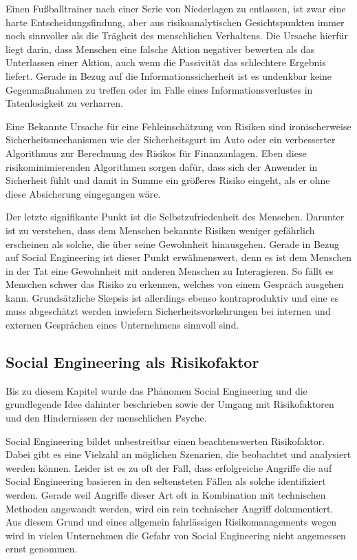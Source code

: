 Einen Fußballtrainer nach einer Serie von Niederlagen zu entlassen, ist zwar eine harte
Entscheidungsfindung, aber aus risikoanalytischen Gesichtspunkten immer noch sinnvoller als die
Trägheit des menschlichen Verhaltens.
Die Ursache hierfür liegt darin, dass Menschen eine falsche Aktion negativer bewerten als das
Unterlassen einer Aktion, auch wenn die Passivität das schlechtere Ergebnis liefert.
Gerade in Bezug auf die Informationssicherheit ist es undenkbar keine Gegenmaßnahmen zu treffen oder
im Falle eines Informationsverlustes in Tatenlosigkeit zu verharren.

Eine Bekannte Ursache für eine Fehleinschätzung von Risiken sind ironischerweise
Sicherheitsmechanismen wie der Sicherheitsgurt im Auto oder ein verbesserter Algorithmus zur
Berechnung des Risikos für Finanzanlagen.
Eben diese risikominimierenden Algorithmen sorgen dafür, dass sich der Anwender in Sicherheit fühlt
und damit in Summe ein größeres Risiko eingeht, als er ohne diese Absicherung eingegangen wäre.

Der letzte signifikante Punkt ist die Selbstzufriedenheit des Menschen. Darunter ist zu verstehen,
dass dem Menschen bekannte Risiken weniger gefährlich erscheinen als solche, die über seine Gewohnheit
hinausgehen.
Gerade in Bezug auf Social Engineering ist dieser Punkt erwähnenswert, denn es ist dem Menschen in der
Tat eine Gewohnheit mit anderen Menschen zu Interagieren.
So fällt es Menschen schwer das Risiko zu erkennen, welches von einem Gespräch ausgehen kann.
Grundsätzliche Skepsis ist allerdings ebenso kontraproduktiv und eine es muss abgeschätzt werden
inwiefern Sicherheitsvorkehrungen bei internen und externen Gesprächen eines Unternehmens sinnvoll
sind.
\cite{risikomanagement}

\subsection{Social Engineering als Risikofaktor}\label{sec:social_engineering_als_risikofaktor}
Bis zu diesem Kapitel wurde das Phänomen Social Engineering und die grundlegende Idee dahinter
beschrieben sowie der Umgang mit Risikofaktoren und den Hindernissen der menschlichen Psyche.

Social Engineering bildet unbestreitbar einen beachtenswerten Risikofaktor.
Dabei gibt es eine Vielzahl an möglichen Szenarien, die beobachtet und analysiert werden können.
Leider ist es zu oft der Fall, dass erfolgreiche Angriffe die auf Social Engineering basieren in den
seltensteten Fällen als solche identifiziert werden.
Gerade weil Angriffe dieser Art oft in Kombination mit technischen Methoden angewandt werden, wird ein
rein technischer Angriff dokumentiert.
Aus diesem Grund und eines allgemein fahrlässigen Risikomanagements wegen wird in vielen Unternehmen
die Gefahr von Social Engineering nicht angemessen ernst genommen.

